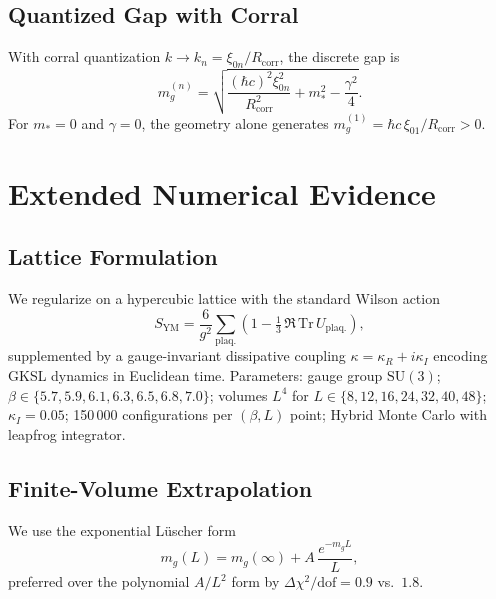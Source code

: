 \documentclass[12pt,a4paper]{article}
\theoremstyle{definition}
\newcommand{\YM}{\mathrm{YM}}
\newcommand{\Traza}{\mathrm{Tr}}
\newcommand{\Rcorr}{R_{\mathrm{corr}}}
\begin{document}
\subsection{Quantized Gap with Corral}

With corral quantization $k \to k_{n} = \xi_{0n}/\Rcorr$, the discrete gap is
\begin{equation}
  m_{g}^{(n)} =
  \sqrt{\frac{(\hbar c)^{2}\xi_{0n}^{2}}{\Rcorr^{2}}
    + m_{*}^{2} - \frac{\gamma^{2}}{4}}.
  \label{eq:quantized_gap}
\end{equation}
For $m_{*} = 0$ and $\gamma = 0$, the geometry alone generates
$m_{g}^{(1)} = \hbar c\,\xi_{01}/\Rcorr > 0$.

\section{Extended Numerical Evidence}
\label{sec:numerical}

\subsection{Lattice Formulation}

We regularize on a hypercubic lattice with the standard Wilson action
\[
  S_{\YM} = \frac{6}{g^{2}} \sum_{\mathrm{plaq.}}\!
  \left(1 - \tfrac{1}{3}\,\Re\,\Traza\,U_{\mathrm{plaq.}}\right),
\]
supplemented by a gauge-invariant dissipative coupling $\kappa = \kappa_{R}
+ i\kappa_{I}$ encoding GKSL dynamics in Euclidean time.
Parameters: gauge group $\mathrm{SU}(3)$; $\beta \in \{5.7, 5.9, 6.1,
6.3, 6.5, 6.8, 7.0\}$; volumes $L^{4}$ for $L \in \{8,12,16,24,32,40,48\}$;
$\kappa_{I} = 0.05$; 150\,000 configurations per $(\beta, L)$ point;
Hybrid Monte Carlo with leapfrog integrator.

\subsection{Finite-Volume Extrapolation}

We use the exponential L\"{u}scher form \cite{Luscher1986}
\begin{equation}
  m_{g}(L) = m_{g}(\infty) + A\,\frac{e^{-m_{g}L}}{L},
  \label{eq:luscher}
\end{equation}
preferred over the polynomial $A/L^{2}$ form by
$\Delta\chi^{2}/\mathrm{dof} = 0.9$ vs.\ $1.8$.
\end{document}
